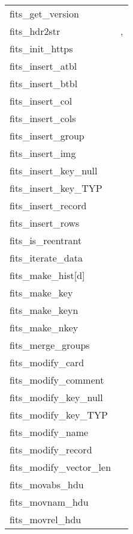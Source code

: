 \documentclass[11pt]{book}
\begin{document}
\newpage
\begin{tabular}{lr}
fits\_get\_version    & \pageref{ffvers} \\
fits\_hdr2str         & \pageref{ffhdr2str}, \pageref{hdr2str} \\
fits\_init\_https  & \pageref{ffihtps} \\
fits\_insert\_atbl    & \pageref{ffitab} \\
fits\_insert\_btbl    & \pageref{ffibin} \\
fits\_insert\_col   & \pageref{fficol} \\
fits\_insert\_cols  & \pageref{fficls} \\
fits\_insert\_group  & \pageref{ffgtis} \\
fits\_insert\_img     & \pageref{ffiimg} \\
fits\_insert\_key\_null   & \pageref{ffikyu} \\
fits\_insert\_key\_TYP    & \pageref{ffikyx} \\
fits\_insert\_record     & \pageref{ffirec} \\
fits\_insert\_rows  & \pageref{ffirow} \\
fits\_is\_reentrant  & \pageref{reentrant} \\
fits\_iterate\_data   & \pageref{ffiter} \\
fits\_make\_hist[d]      & \pageref{makehist} \\
fits\_make\_key       & \pageref{ffmkky} \\
fits\_make\_keyn      & \pageref{ffkeyn} \\
fits\_make\_nkey      & \pageref{ffnkey} \\
fits\_merge\_groups  & \pageref{ffgtmg} \\
fits\_modify\_card       & \pageref{ffmcrd} \\
fits\_modify\_comment    & \pageref{ffmcom} \\
fits\_modify\_key\_null   & \pageref{ffmkyu} \\
fits\_modify\_key\_TYP    & \pageref{ffmkyx} \\
fits\_modify\_name       & \pageref{ffmnam} \\
fits\_modify\_record     & \pageref{ffmrec} \\
fits\_modify\_vector\_len  & \pageref{ffmvec} \\
fits\_movabs\_hdu     & \pageref{ffmahd} \\
fits\_movnam\_hdu     & \pageref{ffmnhd} \\
fits\_movrel\_hdu     & \pageref{ffmrhd} \\

\end{tabular}
\end{document}
